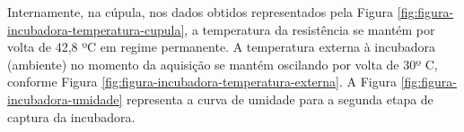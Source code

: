         \begin{figure}[!h]
    	\end{figure}
    	
    	
Internamente, na cúpula, nos dados obtidos representados pela Figura \ref{fig:figura-incubadora-temperatura-cupula}, a temperatura da resistência se mantém por volta de 42,8 ºC em regime permanente. A temperatura externa à incubadora (ambiente) no momento da aquisição se mantém oscilando por volta de 30º C, conforme Figura \ref{fig:figura-incubadora-temperatura-externa}. A Figura \ref{fig:figura-incubadora-umidade} representa a curva de umidade para a segunda etapa de captura da incubadora.
    	
        \begin{figure}[!h]
    	\end{figure}
    	
    	\begin{figure}[!h]
    	\end{figure}
    	
